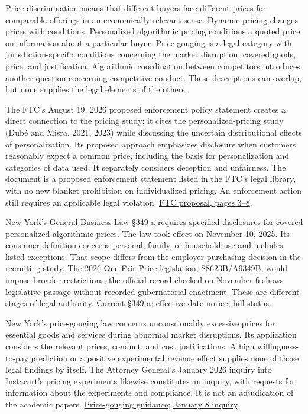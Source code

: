 \noindent Price discrimination means that different buyers face different prices
for comparable offerings in an economically relevant sense. Dynamic
pricing changes prices with conditions. Personalized algorithmic pricing
conditions a quoted price on information about a particular buyer. Price
gouging is a legal category with jurisdiction-specific conditions
concerning the market disruption, covered goods, price, and
justification. Algorithmic coordination between competitors introduces
another question concerning competitive conduct. These descriptions can
overlap, but none supplies the legal elements of the others.

The FTC's August 19, 2026 proposed enforcement policy statement creates
a direct connection to the pricing study: it cites the
personalized-pricing study (Dubé and Misra, 2021, 2023) while discussing
the uncertain distributional effects of personalization. Its proposed
approach emphasizes disclosure when customers reasonably expect a common
price, including the basis for personalization and categories of data
used. It separately considers deception and unfairness. The document is
a proposed enforcement statement listed in the FTC's legal library, with
no new blanket prohibition on individualized pricing. An enforcement
action still requires an applicable legal violation.
\href{https://www.ftc.gov/system/files/ftc_gov/pdf/p034101-ftc-enforcement-policy-statement-re-personalized-pricing-proposed-for-public-comment.pdf}{FTC
proposal, pages 3--8}.

New York's General Business Law §349-a requires specified disclosures
for covered personalized algorithmic prices. The law took effect on
November 10, 2025. Its consumer definition concerns personal, family, or
household use and includes listed exceptions. That scope differs from
the employer purchasing decision in the recruiting study. The 2026 One
Fair Price legislation, S8623B/A9349B, would impose broader
restrictions; the official record checked on November 6 shows
legislative passage without recorded gubernatorial enactment. These are
different stages of legal authority.
\href{https://www.nysenate.gov/legislation/laws/GBS/349-A}{Current
§349-a};
\href{https://ag.ny.gov/press-release/2025/attorney-general-james-warns-new-yorkers-about-algorithmic-pricing-new-law-takes}{effective-date
notice};
\href{https://www.nysenate.gov/legislation/bills/2025/S8623}{bill
status}.

New York's price-gouging law concerns unconscionably excessive prices
for essential goods and services during abnormal market disruptions. Its
application considers the relevant prices, conduct, and cost
justifications. A high willingness-to-pay prediction or a positive
experimental revenue effect supplies none of those legal findings by
itself. The Attorney General's January 2026 inquiry into Instacart's
pricing experiments likewise constitutes an inquiry, with requests for
information about the experiments and compliance. It is not an
adjudication of the academic papers.
\href{https://ag.ny.gov/resources/individuals/consumer-issues/price-gouging}{Price-gouging
guidance};
\href{https://ag.ny.gov/press-release/2026/attorney-general-james-demands-answers-instacart-about-algorithmic-pricing}{January
8 inquiry}.

